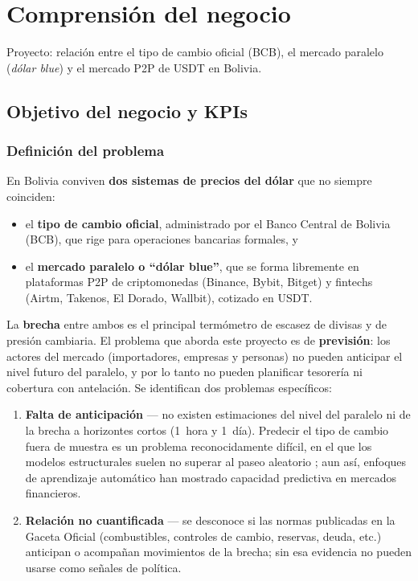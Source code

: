 \section{Comprensión del negocio}
\label{sec:negocio}

Proyecto: relación entre el tipo de cambio oficial (BCB), el mercado paralelo
(\emph{dólar blue}) y el mercado P2P de USDT en Bolivia.

\subsection{Objetivo del negocio y KPIs}

\subsubsection{Definición del problema}

En Bolivia conviven \textbf{dos sistemas de precios del dólar} que no siempre
coinciden:

\begin{itemize}
  \item el \textbf{tipo de cambio oficial}, administrado por el Banco Central de
        Bolivia (BCB), que rige para operaciones bancarias formales, y
  \item el \textbf{mercado paralelo o ``dólar blue''}, que se forma libremente en
        plataformas P2P de criptomonedas (Binance, Bybit, Bitget) y
        fintechs (Airtm, Takenos, El Dorado, Wallbit), cotizado en USDT.
\end{itemize}

La \textbf{brecha} entre ambos es el principal termómetro de escasez de divisas
y de presión cambiaria. El problema que aborda este proyecto es de
\textbf{previsión}: los actores del mercado (importadores, empresas y personas)
no pueden anticipar el nivel futuro del paralelo, y por lo tanto no pueden
planificar tesorería ni cobertura con antelación. Se identifican dos problemas
específicos:

\begin{enumerate}
  \item \textbf{Falta de anticipación} --- no existen estimaciones del nivel del
        paralelo ni de la brecha a horizontes cortos (1~hora y 1~día). Predecir el
        tipo de cambio fuera de muestra es un problema reconocidamente difícil,
        en el que los modelos estructurales suelen no superar al paseo aleatorio
        ; aun así, enfoques de aprendizaje automático
        han mostrado capacidad predictiva en mercados financieros.
  \item \textbf{Relación no cuantificada} --- se desconoce si las normas
        publicadas en la Gaceta Oficial (combustibles, controles de cambio,
        reservas, deuda, etc.) anticipan o acompañan movimientos de la brecha;
        sin esa evidencia no pueden usarse como señales de política.
\end{enumerate}

